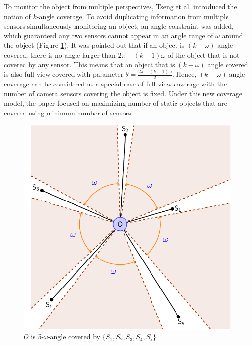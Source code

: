 To monitor the object from multiple perspectives, Tseng et al. \cite{tseng2012k} introduced the notion of $k$-angle coverage. To avoid duplicating information from multiple sensors simultaneously monitoring an object, an angle constraint was added, which guaranteed  any two sensors cannot appear in an angle range of $\omega$ around the object (Figure \ref{fig:02}). It was pointed out that if an object is $(k-\omega)$ angle covered, there is no angle larger than $2\pi-(k-1)\omega$ of the object that is not covered by any sensor. This means that an object that is $(k-\omega)$ angle covered is also full-view covered with parameter $\theta=\displaystyle\frac{2\pi-(k-1)\omega}{2}$. Hence, $(k-\omega)$ angle coverage can be considered as a special case of full-view coverage with the number of camera sensors covering the object is fixed. Under this new coverage model, the paper focused on maximizing number of static objects that are covered using minimum number of sensors.
\begin{figure}[p]
	\centering
	\includegraphics[scale=0.6]{komega.pdf}
	\caption{$O$ is 5-$\omega$-angle covered by $\{S_1, S_2, S_3, S_4, S_5\}$}
	\label{fig:02}
\end{figure}

